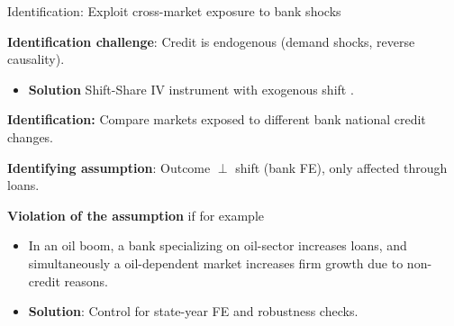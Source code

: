 \documentclass[aspectratio=169]{beamer}
\begin{document}


\begin{frame}{Identification: Exploit cross-market exposure to bank shocks} 

\textbf{Identification challenge}: Credit is endogenous (demand shocks, reverse causality).
\begin{itemize}
    \item[$\Rightarrow$] \textbf{Solution} Shift-Share IV instrument with exogenous shift \textcolor{lightgray}{\citep{borusyak2022quasi}}. 
\end{itemize}

\vspace{5mm}
\pause

\textbf{Identification:} Compare markets exposed to different bank national credit changes.

\vspace{5mm}


\textbf{Identifying assumption}: Outcome $\perp$ shift (bank FE), only affected through loans.

\vspace{5mm}
\pause

\textbf{Violation of the assumption} if for example
\begin{itemize}
    \item In an oil boom, a bank specializing on oil-sector increases loans, and simultaneously a oil-dependent market increases firm growth due to non-credit reasons. 
    \item[$\Rightarrow$] \textbf{Solution}: Control for state-year FE and robustness checks.
\end{itemize}

\end{frame}

\end{document}
